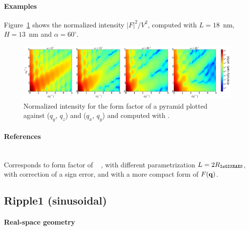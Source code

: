 \paragraph{Examples}
Figure~\ref{fig:FFPyramidEx} shows the normalized intensity
$|F|^2/V^2$, computed with $L=18$~nm, $H=13$~nm and
$\alpha=60^{\circ}$.

\begin{figure}[H]
\begin{center}
\includegraphics[width=\textwidth]{fig/ff2/ff_pyramid.pdf}
\end{center}
\caption{Normalized intensity for the form factor of a
  pyramid plotted against ($q_y$, $q_z$) and  
  ($q_x$, $q_y$) and computed with  .}
\label{fig:FFPyramidEx}
\end{figure}

\paragraph{References}\strut\\
Corresponds to  form factor of \IsGISAXS\
\cite[Eq.~2.31]{Laz08} \cite[Eq.~221]{ReLL09},
with different parametrization $L=2R_{\rm{\texttt{IsGISXAXS}}}$,
with correction of a sign error,
and with a more compact form of $F(\mathbf{q})$.

\clearpage
\subsection{Ripple1 (sinusoidal)} \label{sec:Ripple1}  

\paragraph{Real-space geometry}\strut\\

